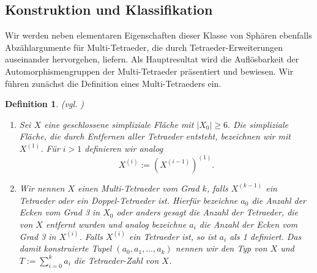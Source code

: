 \documentclass[12pt,titlepage,twoside,cleardoublepage]{article}
\theoremstyle{nummermitklammern}
\newtheorem{definition}[temp]{Definition}
\newtheorem{definition}[zahl]{Definition}
\numberwithin{equation}{section}
\begin{document}
\subsection{Konstruktion und Klassifikation}\label{cactus}
Wir werden neben elementaren Eigenschaften dieser Klasse von Sphären ebenfalls Abzählargumente für Multi-Tetraeder, die durch Tetraeder-Erweiterungen auseinander hervorgehen, liefern. Als Hauptresultat wird die Auflösbarkeit der Automorphismengruppen der Multi-Tetraeder präsentiert und bewiesen. 
Wir führen zunächst die Definition eines Multi-Tetraeders ein.
\begin{definition}{\textsc{(}vgl. \textsc{\cite{simp})}}\label{defcac}
\begin{enumerate}
\item Sei $X$ eine geschlossene simpliziale Fläche mit $\vert X_0\vert \geq 6.$
 Die simpliziale Fläche, die durch Entfernen aller Tetraeder entsteht, bezeichnen wir mit $X^{(1)}$. Für $i>1$ definieren wir analog 
\[
X^{(i)}:=(X^{(i-1)})^{(1)}.
\]
\item Wir nennen $X$ einen \emph{Multi-Tetraeder vom Grad} $k$, falls $X^{(k-1)}$ ein Tetraeder oder ein Doppel-Tetraeder ist. Hierfür bezeichne $a_0$ die Anzahl der Ecken vom Grad 3 in $X_0$ oder anders gesagt die Anzahl der Tetraeder, die von $X$ entfernt wurden und analog bezeichne $a_i$ die Anzahl der Ecken vom Grad 3 in $X^{(i)}$. Falls $X^{(i)}$ ein Tetraeder ist, so ist $a_i$ als 1 definiert. Das damit konstruierte Tupel $(a_0,a_1,\ldots,a_k)$ nennen wir den \emph{Typ} von $X$ und $T:=\sum_{i=0}^{k} a_i$ die \emph{Tetraeder-Zahl} von $X$.\\
\end{enumerate}
\end{definition}
\end{document}

